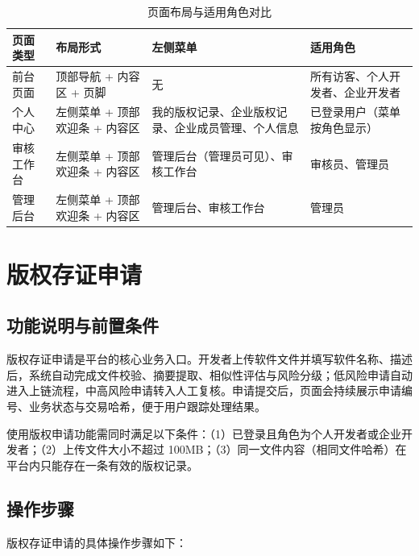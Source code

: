 \documentclass[UTF8,a4paper,12pt]{ctexart}
\newcommand{\notice}[1]{%
  \par\vspace{0.6em}\noindent
  {\setlength{\fboxsep}{6pt}%
   \colorbox{gray!8}{\parbox{\dimexpr\linewidth-12pt\relax}{%
     \setlength{\parindent}{2em}\small #1}}}%
  \par\vspace{0.6em}%
}
\begin{document}
\begin{table}[H]
  \centering
  \caption{页面布局与适用角色对比}
  \label{tab:layout-compare}
  \begin{tabularx}{0.96\textwidth}{p{} p{} p{} Y}
    \toprule
    页面类型 & 布局形式 & 左侧菜单 & 适用角色 \\
    \midrule
    前台页面 & 顶部导航 + 内容区 + 页脚 & 无 & 所有访客、个人开发者、企业开发者 \\
    个人中心 & 左侧菜单 + 顶部欢迎条 + 内容区 & 我的版权记录、企业版权记录、企业成员管理、个人信息 & 已登录用户（菜单按角色显示） \\
    审核工作台 & 左侧菜单 + 顶部欢迎条 + 内容区 & 管理后台（管理员可见）、审核工作台 & 审核员、管理员 \\
    管理后台 & 左侧菜单 + 顶部欢迎条 + 内容区 & 管理后台、审核工作台 & 管理员 \\
    \bottomrule
  \end{tabularx}
\end{table}

\section{版权存证申请}
\label{sec:apply}

\subsection{功能说明与前置条件}
\indent 版权存证申请是平台的核心业务入口。开发者上传软件文件并填写软件名称、描述后，系统自动完成文件校验、摘要提取、相似性评估与风险分级；低风险申请自动进入上链流程，中高风险申请转入人工复核。申请提交后，页面会持续展示申请编号、业务状态与交易哈希，便于用户跟踪处理结果。\par

\notice{使用版权申请功能需同时满足以下条件：（1）已登录且角色为个人开发者或企业开发者；（2）上传文件大小不超过 100MB；（3）同一文件内容（相同文件哈希）在平台内只能存在一条有效的版权记录。}

\subsection{操作步骤}
\indent 版权存证申请的具体操作步骤如下：\par
\end{document}
